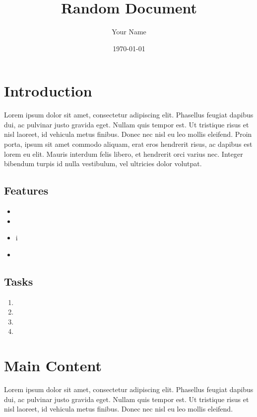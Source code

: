\documentclass{article}
\begin{document}
\title{Random Document}
\author{Your Name}
\date{\today}
\maketitle

\section{Introduction}
Lorem ipsum dolor sit amet, consectetur adipiscing elit. Phasellus feugiat dapibus dui, ac pulvinar justo gravida eget. Nullam quis tempor est. Ut tristique risus et nisl laoreet, id vehicula metus finibus. Donec nec nisl eu leo mollis eleifend. Proin porta, ipsum sit amet commodo aliquam, erat eros hendrerit risus, ac dapibus est lorem eu elit. Mauris interdum felis libero, et hendrerit orci varius nec. Integer bibendum turpis id nulla vestibulum, vel ultricies dolor volutpat.

\subsection{Features}
\begin{itemize}[label={}, leftmargin=2cm]
    \item {}
    \item {}
    \item {}i
    \item {}
\end{itemize}

\subsection{Tasks}
\begin{enumerate}[label=\arabic*., leftmargin=2cm]
    \item {}
    \item {}
    \item {}
    \item {}
\end{enumerate}

\section{Main Content}
Lorem ipsum dolor sit amet, consectetur adipiscing elit. Phasellus feugiat dapibus dui, ac pulvinar justo gravida eget. Nullam quis tempor est. Ut tristique risus et nisl laoreet, id vehicula metus finibus. Donec nec nisl eu leo mollis eleifend. 
\end{document}
